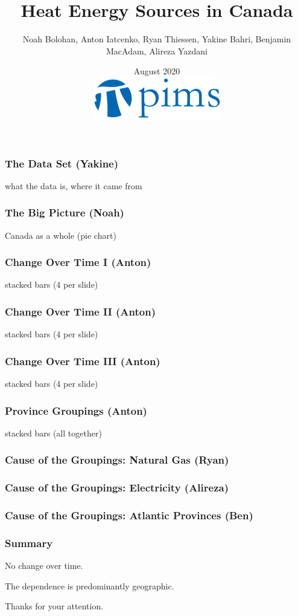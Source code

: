 \documentclass{beamer}
\title{Heat Energy Sources in Canada}
\author{Noah Bolohan, Anton Iatcenko, Ryan Thiessen, Yakine Bahri, Benjamin MacAdam, Alireza Yazdani}
\institute{Math\textsuperscript{Industry}}
\date{August 2020  \\ \vspace{30pt} \includegraphics[scale=0.3]{pims_logo.png} }
\begin{document}
\frame{\titlepage}

\begin{frame}
\frametitle{The Data Set (Yakine)}
what the data is, where it came from
\end{frame}


\begin{frame}
\frametitle{The Big Picture (Noah)}
Canada as a whole (pie chart)
\end{frame}


\begin{frame}
\frametitle{Change Over Time I (Anton)}
stacked bars (4 per slide)
\end{frame}


\begin{frame}
\frametitle{Change Over Time II (Anton)}
stacked bars (4 per slide)
\end{frame}


\begin{frame}
\frametitle{Change Over Time III (Anton)}
stacked bars (4 per slide)
\end{frame}


\begin{frame}
\frametitle{Province Groupings (Anton)}
stacked bars (all together)
\end{frame}


\begin{frame}
\frametitle{Cause of the Groupings: Natural Gas (Ryan)}

\end{frame}


\begin{frame}
\frametitle{Cause of the Groupings: Electricity (Alireza)}

\end{frame}


\begin{frame}
\frametitle{Cause of the Groupings: Atlantic Provinces (Ben)}

\end{frame}



\begin{frame}
\frametitle{Summary}

No change over time. 

The dependence is predominantly geographic. 

Thanks for your attention.  

\end{frame}
\end{document}
